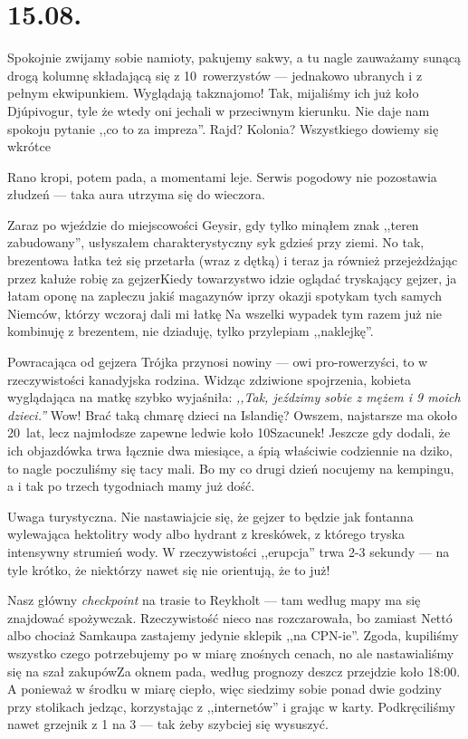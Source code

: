 \chapter*{15.08.}

Spokojnie zwijamy sobie namioty, pakujemy sakwy, a tu nagle zauważamy sunącą drogą kolumnę składającą się z 10~rowerzystów --- jednakowo ubranych i z pełnym ekwipunkiem. Wyglądają tak\textellipsis znajomo! Tak, mijaliśmy ich już koło Djúpivogur, tyle że wtedy oni jechali w przeciwnym kierunku. Nie daje nam spokoju pytanie ,,co to za impreza''. Rajd? Kolonia? Wszystkiego dowiemy się wkrótce\textellipsis

Rano kropi, potem pada, a momentami leje. Serwis pogodowy nie pozostawia złudzeń --- taka aura utrzyma się do wieczora.

Zaraz po wjeździe do miejscowości Geysir, gdy tylko minąłem znak ,,teren zabudowany'', usłyszałem charakterystyczny syk gdzieś przy ziemi. No tak, brezentowa łatka też się przetarła (wraz z dętką) i teraz ja również przejeżdżając przez kałuże robię za gejzer\textellipsis  Kiedy towarzystwo idzie oglądać tryskający gejzer, ja łatam oponę na zapleczu jakiś magazynów i\textellipsis przy okazji spotykam tych samych Niemców, którzy wczoraj dali mi łatkę \smile Na wszelki wypadek tym razem już nie kombinuję z brezentem, nie dziaduję, tylko przylepiam ,,naklejkę''.

Powracająca od gejzera Trójka przynosi nowiny --- owi pro-rowerzyści, to w rzeczywistości kanadyjska rodzina. Widząc zdziwione spojrzenia, kobieta wyglądająca na matkę szybko wyjaśniła: \emph{,,Tak, jeździmy sobie z mężem i 9 moich dzieci.''} Wow! Brać taką chmarę dzieci na Islandię? Owszem, najstarsze ma około 20~lat, lecz najmłodsze zapewne ledwie koło 10\textellipsis Sza\-cunek! Jeszcze gdy dodali, że ich objazdówka trwa łącznie dwa miesiące, a śpią właściwie codziennie na dziko, to nagle poczuliśmy się tacy mali. Bo my co drugi dzień nocujemy na kempingu, a i tak po trzech tygodniach mamy już dość.

Uwaga turystyczna. Nie nastawiajcie się, że gejzer to będzie jak fontanna wylewająca hektolitry wody albo hydrant z kreskówek, z którego tryska intensywny strumień wody. W rzeczywistości ,,erupcja'' trwa 2-3 sekundy --- na tyle krótko, że niektórzy nawet się nie orientują, że to już!

Nasz główny \emph{checkpoint} na trasie to Reykholt --- tam według mapy ma się znajdować spożywczak. Rzeczywistość nieco nas rozczarowała, bo zamiast Nettó albo chociaż Samkaupa zastajemy jedynie sklepik ,,na CPN-ie''. Zgoda, kupiliśmy wszystko czego potrzebujemy po w miarę znośnych cenach, no ale nastawialiśmy się na szał zakupów\textellipsis Za oknem pada, według prognozy deszcz przejdzie koło 18:00. A ponieważ w środku w miarę ciepło, więc siedzimy sobie ponad dwie godziny przy stolikach jedząc, korzystając z ,,internetów'' i grając w karty. Podkręciliśmy nawet grzejnik z 1 na 3 --- tak żeby szybciej się wysuszyć.

